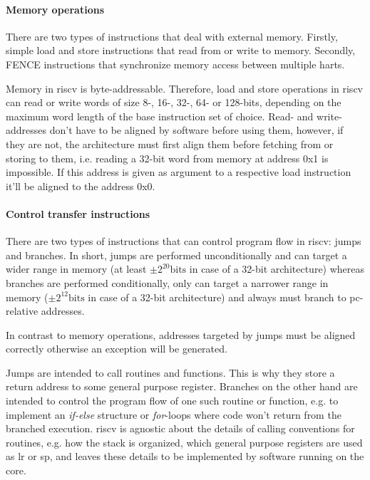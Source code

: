 \paragraph{Memory operations}
There are two types of instructions that deal with external memory.
Firstly, simple load and store instructions that read from or write to memory.
Secondly, FENCE instructions that synchronize memory access between multiple \glspl{hart}.

Memory in \gls{riscv} is byte-addressable.
Therefore, load and store operations in \gls{riscv} can read or write words of size 8-, 16-, 32-, 64- or 128-bits, depending on the maximum word length of the base instruction set of choice.
Read- and write-addresses don't have to be aligned by software before using them, however, if they are not, the architecture must first align them before fetching from or storing to them, i.e. reading a 32-bit word from memory at address 0x1 is impossible.
If this address is given as argument to a respective load instruction it'll be aligned to the address 0x0.

\paragraph{Control transfer instructions}
There are two types of instructions that can control program flow in \gls{riscv}: jumps and branches.
In short, jumps are performed unconditionally and can target a wider range in memory (at least $ \pm 2^{20}\text{bits} $ in case of a 32-bit architecture) whereas branches are performed conditionally, only can target a narrower range in memory ($ \pm 2^{12}\text{bits} $ in case of a 32-bit architecture) and always must branch to \gls{pc}-relative addresses.

In contrast to memory operations, addresses targeted by jumps must be aligned correctly otherwise an exception will be generated.

Jumps are intended to call routines and functions.
This is why they store a return address to some general purpose register.
Branches on the other hand are intended to control the program flow of one such routine or function, e.g. to implement an \textit{if-else} structure or \textit{for}-loops where code won't return from the branched execution.
\gls{riscv} is agnostic about the details of calling conventions for routines, e.g. how the stack is organized, which general purpose registers are used as \gls{lr} or \gls{sp}, and leaves these details to be implemented by software running on the core.

